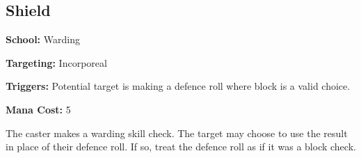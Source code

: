 \subsection*{Shield}

\noindent
\textbf{School:} Warding

\noindent
\textbf{Targeting:} Incorporeal

\noindent
\textbf{Triggers:} Potential target is making a defence roll where block is a
valid choice.

\noindent
\textbf{Mana Cost:} 5

The caster makes a warding skill check. The target may choose to use the result
in place of their defence roll. If so, treat the defence roll as if it was a
block check.
